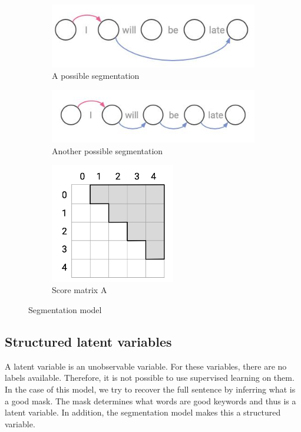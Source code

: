 \begin{figure}
\begin{subfigure}[b]{0.45\textwidth}
        \centering
        \includegraphics[width=\textwidth]{figs/segmentation3.jpeg}
        \caption{A possible segmentation}
        \label{fig:segmentation}
    \end{subfigure}
    \hfill
    \begin{subfigure}[b]{0.45\textwidth}
        \centering
        \includegraphics[width=\textwidth]{figs/segmentation4.jpeg}
        \caption{Another possible segmentation}
        \label{fig:segmentation2}
    \end{subfigure}
    \hfill
    \begin{subfigure}[b]{0.45\textwidth}
        \centering
        \includegraphics[width=0.6\textwidth]{figs/matrixA.png}
        \caption{Score matrix A}
        \label{fig:matrixA}
    \end{subfigure}
    \caption{Segmentation model}
    \label{fig:segmentation_model}
\end{figure}

\subsection{Structured latent variables}
A latent variable is an unobservable variable.
For these variables, there are no labels available. 
Therefore, it is not possible to use supervised learning on them. 
In the case of this model, we try to recover the full sentence by inferring what is a good mask.
The mask determines what words are good keywords and thus is a latent variable. 
In addition, the segmentation model makes this a structured variable. 


